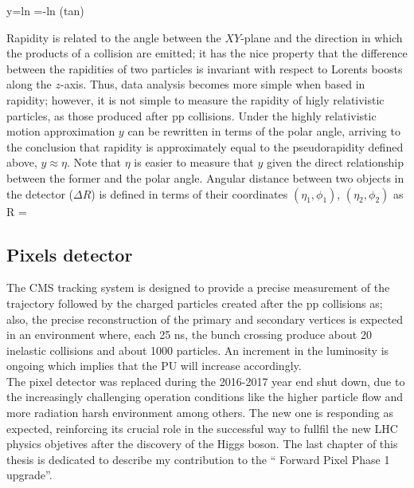 \beqn
y=ln \qquad \eta=-ln \left(tan\right)
\label{eqn:eta}
\eeqn

\noindent Rapidity is related to the angle between the $XY$-plane and the direction in which the products of a collision are emitted; it has the nice property that the difference between the rapidities of two particles is invariant with respect to Lorents boosts along the $z$-axis. Thus, data analysis becomes more simple when based in rapidity; however, it is not simple to measure the rapidity of higly relativistic particles, as those produced after pp collisions. Under the highly relativistic motion approximation $y$ can be rewritten in terms of the polar angle, arriving to the conclusion that rapidity is approximately equal to the pseudorapidity defined above, \ie $y\approx\eta$. Note that $\eta$ is easier to measure that $y$ given the direct relationship between the former and the polar angle. Angular distance between two objects in the detector ($\Delta R$) is defined in terms of their coordinates $(\eta_1,\phi_1)$, $(\eta_2,\phi_2)$ as
\beqn
\Delta R = 
\eeqn

\subsection{Pixels detector}

\noindent  The CMS tracking system is designed to provide a precise measurement of the trajectory followed by the charged particles created after the pp collisions as; also, the precise reconstruction of the primary and secondary vertices is expected in an environment where, each 25 ns, the bunch crossing produce about 20 inelastic collisions and about 1000 particles. An increment in the luminosity is ongoing which implies that the PU will increase accordingly. \\

\noindent The pixel detector was replaced during the 2016-2017 year end shut down, due to the increasingly challenging operation conditions like the higher particle flow and more radiation harsh environment among others. The new one is responding as expected, reinforcing its crucial role in the successful way to fullfil the new LHC physics objetives after the discovery of the Higgs boson. The last chapter of this thesis is dedicated to describe my contribution to the `` Forward Pixel Phase 1 upgrade''.\\


